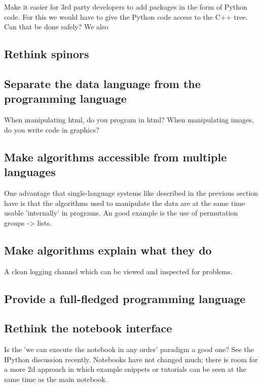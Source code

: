 \documentclass[11pt]{article}
\begin{document}
Make it easier for 3rd party developers to add packages in the form of
Python code. For this we would have to give the Python code access to
the C++ tree. Can that be done safely? We also 

\subsection{Rethink spinors}

\subsection{Separate the data language from the programming language}

When manipulating html, do you program in html? When manipulating images, do you write
code in graphics?

\subsection{Make algorithms accessible from multiple languages}

One advantage that single-language systems like described in the
previous section have is that the algorithms used to manipulate the
data are at the same time usable 'internally' in programs. An good
example is the use of permutation groups -> lists.

\subsection{Make algorithms explain what they do}

A clean logging channel which can be viewed and inspected for problems.


\subsection{Provide a full-fledged programming language}



\subsection{Rethink the notebook interface}

Is the 'we can execute the notebook in any order' paradigm a good one?
See the IPython discussion recently. Notebooks have not changed much;
there is room for a more 2d approach in which example snippets or
tutorials can be seen at the same time as the main notebook.
\end{document}
